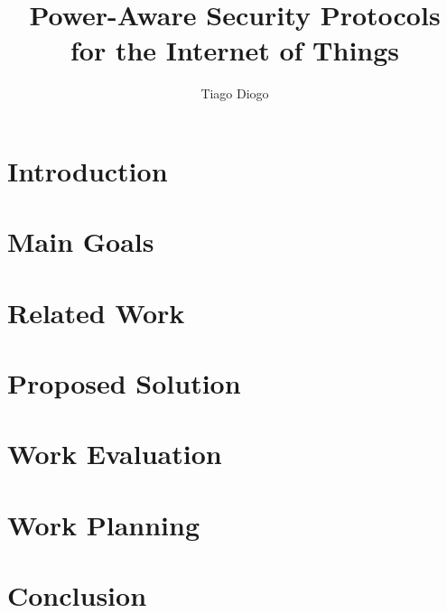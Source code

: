 \documentclass{llncs}
\begin{document}
\title{Power-Aware Security Protocols for the Internet of Things}
%
\titlerunning{}  %
%
\author{Tiago Diogo}
%
%
%

\maketitle              %


\section{Introduction}


\section{Main Goals}


\section{Related Work}


\section{Proposed Solution}


\section{Work Evaluation}


\section{Work Planning}


\section{Conclusion}

\end{document}
